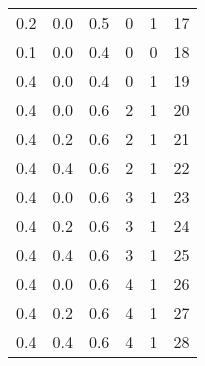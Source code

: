 \begin{table}
\begin{tabular}{rrrrrr}
     0.2 &      0.0 &         0.5 &             0 &                   1 &             17 \\
     0.1 &      0.0 &         0.4 &             0 &                   0 &             18 \\
     0.4 &      0.0 &         0.4 &             0 &                   1 &             19 \\
     0.4 &      0.0 &         0.6 &             2 &                   1 &             20 \\
     0.4 &      0.2 &         0.6 &             2 &                   1 &             21 \\
     0.4 &      0.4 &         0.6 &             2 &                   1 &             22 \\
     0.4 &      0.0 &         0.6 &             3 &                   1 &             23 \\
     0.4 &      0.2 &         0.6 &             3 &                   1 &             24 \\
     0.4 &      0.4 &         0.6 &             3 &                   1 &             25 \\
     0.4 &      0.0 &         0.6 &             4 &                   1 &             26 \\
     0.4 &      0.2 &         0.6 &             4 &                   1 &             27 \\
     0.4 &      0.4 &         0.6 &             4 &                   1 &             28 \\
\bottomrule
\end{tabular}
\end{table}
